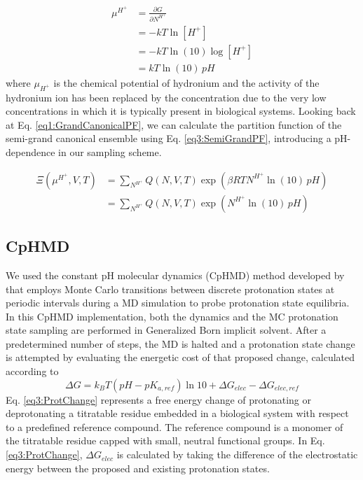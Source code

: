 \begin{align}
   \mu ^ {H^+} & = \frac {\partial G} {\partial N^{H^+}} \nonumber \\
               & = -kT\ln [H^+] \nonumber \\
               & = -kT\ln (10) \log [H^+] \nonumber \\
               & = kT\ln (10)\, pH
   \label{eq3:ChemicalPotential}
\end{align}
where $\mu_{H^+}$ is the chemical potential of hydronium and the activity of the
hydronium ion has been replaced by the concentration due to the very low
concentrations in which it is typically present in biological systems. Looking
back at Eq. \ref{eq1:GrandCanonicalPF}, we can calculate the partition function
of the semi-grand canonical ensemble using Eq. \ref{eq3:SemiGrandPF},
introducing a pH-dependence in our sampling scheme.

\begin{align}
   \Xi(\mu ^ {H^+}, V, T) & = \sum _ {N^{H^+}} Q(N, V, T) \exp(\beta RT N^{H^+}
                  \ln(10)\, pH) \nonumber \\
                          & = \sum _ {N^{H^+}} Q(N, V, T) \exp(N^{H^+} \ln(10)\,
                  pH)
   \label{eq3:SemiGrandPF}
\end{align}

\subsection{CpHMD}

We used the constant pH molecular dynamics (CpHMD) method developed by
\citeauthor{Mongan_JComputChem_2004_v25_p2038}
\cite{Mongan_JComputChem_2004_v25_p2038} that employs Monte Carlo transitions
between discrete protonation states at periodic intervals during a MD simulation
to probe protonation state equilibria. In this CpHMD implementation, both the
dynamics and the MC protonation state sampling are performed in Generalized Born
implicit solvent. After a predetermined number of steps, the MD is halted and a
protonation state change is attempted by evaluating the energetic cost of that
proposed change, calculated according to
\cite{Mongan_JComputChem_2004_v25_p2038}
\begin{equation}
   \Delta G = k _ B T \left( pH - pK _ {a,ref} \right) \ln 10 + \Delta G _
         {elec} - \Delta G _ {elec,ref}
   \label{eq3:ProtChange}
\end{equation}
Eq. \ref{eq3:ProtChange} represents a free energy change of protonating or
deprotonating a titratable residue embedded in a biological system with respect
to a predefined reference compound. The reference compound is a monomer of the
titratable residue capped with small, neutral functional groups. In Eq.
\ref{eq3:ProtChange}, $\Delta G _ {elec}$ is calculated by taking the difference
of the electrostatic energy between the proposed and existing protonation
states. \cite{Mongan_JComputChem_2004_v25_p2038}

